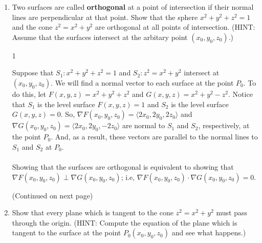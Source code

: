 \documentclass[12pt]{article}
\begin{document}
\begin{enumerate}
\item Two surfaces are called {\bf orthogonal} at a point of intersection if their normal lines are perpendicular at that point.  Show that the sphere $x^2+y^2+z^2=1$ and the cone $z^2=x^2+y^2$ are orthogonal at all points of intersection.  (HINT: Assume that the surfaces intersect at the arbitary point $(x_0,y_0,z_0)$.)

{{1\linewidth}{Suppose that $S_1: x^2+y^2+z^2=1$ and $S_2: z^2=x^2+y^2$ intersect at $(x_0,y_0,z_0)$. We will find a normal vector to each surface at the point $P_0$.  To do this, let $F(x,y,z)=x^2+y^2+z^2$ and $G(x,y,z)=x^2+y^2-z^2$.  Notice that $S_1$ is the level surface $F(x,y,z)=1$ and $S_2$ is the level surface $G(x,y,z)=0$.  So, $\nabla F(x_0,y_0,z_0)=\langle 2x_0,2y_0,2z_0\rangle$ and $\nabla G(x_0,y_0,z_0)=\langle 2x_0,2y_0,-2z_0\rangle$ are normal to $S_1$ and $S_2$, respectively, at the point $P_0$.  And, as a result, these vectors are parallel to the normal lines to $S_1$ and $S_2$ at $P_0$.\\
\\
Showing that the surfaces are orthogonal is equivalent to showing that $\nabla F(x_0,y_0,z_0) \perp \nabla G(x_0,y_0,z_0)$; i.e, $\nabla F(x_0,y_0,z_0) \cdot \nabla G(x_0,y_0,z_0)=0$.
\medskip
\begin{center}
(Continued on next page)
\end{center}
}}
\newpage
{}

\item Show that every plane which is tangent to the cone $z^2=x^2+y^2$ must pass through the origin. (HINT: Compute the equation of the plane which is tangent to the surface at the point $P_0(x_0,y_0,z_0)$ and see what happens.)


\end{enumerate}
\end{document}
